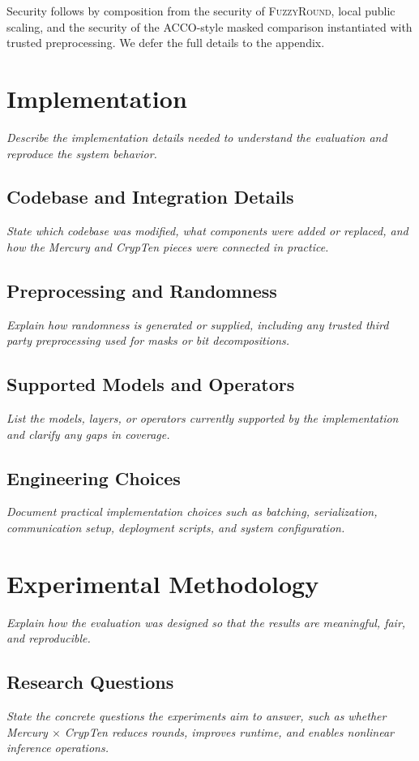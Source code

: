 Security follows by composition from the security of
\textsc{FuzzyRound}, local public scaling, and the security of the
ACCO-style masked comparison instantiated with trusted preprocessing.
We defer the full details to the appendix.

\section{Implementation}
\textit{Describe the implementation details needed to understand the evaluation and reproduce the system behavior.}

\subsection{Codebase and Integration Details}
\textit{State which codebase was modified, what components were added or replaced, and how the Mercury and CrypTen pieces were connected in practice.}

\subsection{Preprocessing and Randomness}
\textit{Explain how randomness is generated or supplied, including any trusted third party preprocessing used for masks or bit decompositions.}

\subsection{Supported Models and Operators}
\textit{List the models, layers, or operators currently supported by the implementation and clarify any gaps in coverage.}

\subsection{Engineering Choices}
\textit{Document practical implementation choices such as batching, serialization, communication setup, deployment scripts, and system configuration.}

\section{Experimental Methodology}
\textit{Explain how the evaluation was designed so that the results are meaningful, fair, and reproducible.}

\subsection{Research Questions}
\textit{State the concrete questions the experiments aim to answer, such as whether Mercury $\times$ CrypTen reduces rounds, improves runtime, and enables nonlinear inference operations.}

